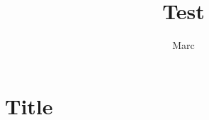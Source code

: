 \documentclass{article}
\begin{document}
\author{Marc}
\title{Test}
\maketitle

\section{Title}
\label{sec:title}
\end{document}

